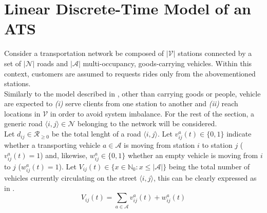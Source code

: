 \section{Linear Discrete-Time Model of an ATS}\label{sec:linear_discrete_time_model}
Consider a transportation network be composed of $|\mathcal{V}|$ stations connected by a set of $|\mathcal{N}|$ roads and $|\mathcal{A}|$ multi-occupancy, goods-carrying vehicles. Within this context, customers are assumed to requests rides only from the abovementioned stations.\\ %
Similarly to the model described in , other than carrying goods or people, vehicle are expected to \textit{(i)} serve clients from one station to another and \textit{(ii)} reach locations in $\mathcal{V}$ in order to avoid system imbalance. For the rest of the section, a generic road $\langle i,j\rangle \in \mathcal{N}$ belonging to the network will be considered.\\
Let $d_{ij} \in \mathcal{R}_{\ge0}$ be the total lenght of a road $\langle i,j\rangle$. Let $v^a_{ij}(t) \in \{0,1\}$ indicate whether a transporting vehicle $a \in \mathcal{A}$ is moving from station $i$ to station $j$ ($v^a_{ij}(t) = 1$) and, likewise, $w^{a}_{ij}\in \{0,1\} $ whether an empty vehicle is moving from $i$ to $j$ ($w^{a}_{ij}(t)= 1$). Let $V_{ij}(t) \in \{ x \in \mathbb{N}_0 : x \leq |\mathcal{A}|\}$ being the total number of vehicles currently circulating on the street $\langle i,j\rangle$, this can be clearly expressed as in . \\

\begin{equation}
	V_{ij}(t) = \sum_{a \in \mathcal{A}} v^{a}_{ij}(t) +w^{a}_{ij}(t)
	\label{eq:vehicles_on_street}
\end{equation}

